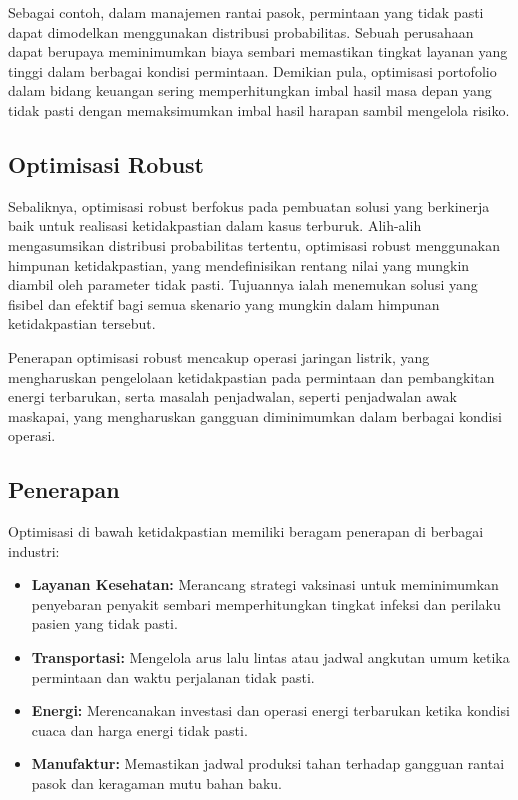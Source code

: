 Sebagai contoh, dalam manajemen rantai pasok, permintaan yang tidak pasti dapat dimodelkan menggunakan distribusi probabilitas. Sebuah perusahaan dapat berupaya meminimumkan biaya sembari memastikan tingkat layanan yang tinggi dalam berbagai kondisi permintaan. Demikian pula, optimisasi portofolio dalam bidang keuangan sering memperhitungkan imbal hasil masa depan yang tidak pasti dengan memaksimumkan imbal hasil harapan sambil mengelola risiko.

\subsection{Optimisasi Robust}

Sebaliknya, optimisasi robust berfokus pada pembuatan solusi yang berkinerja baik untuk realisasi ketidakpastian dalam kasus terburuk. Alih-alih mengasumsikan distribusi probabilitas tertentu, optimisasi robust menggunakan himpunan ketidakpastian, yang mendefinisikan rentang nilai yang mungkin diambil oleh parameter tidak pasti. Tujuannya ialah menemukan solusi yang fisibel dan efektif bagi semua skenario yang mungkin dalam himpunan ketidakpastian tersebut.

Penerapan optimisasi robust mencakup operasi jaringan listrik, yang mengharuskan pengelolaan ketidakpastian pada permintaan dan pembangkitan energi terbarukan, serta masalah penjadwalan, seperti penjadwalan awak maskapai, yang mengharuskan gangguan diminimumkan dalam berbagai kondisi operasi.

\subsection{Penerapan}

Optimisasi di bawah ketidakpastian memiliki beragam penerapan di berbagai industri:
\begin{itemize}
    \item \textbf{Layanan Kesehatan:} Merancang strategi vaksinasi untuk meminimumkan penyebaran penyakit sembari memperhitungkan tingkat infeksi dan perilaku pasien yang tidak pasti.
    \item \textbf{Transportasi:} Mengelola arus lalu lintas atau jadwal angkutan umum ketika permintaan dan waktu perjalanan tidak pasti.
    \item \textbf{Energi:} Merencanakan investasi dan operasi energi terbarukan ketika kondisi cuaca dan harga energi tidak pasti.
    \item \textbf{Manufaktur:} Memastikan jadwal produksi tahan terhadap gangguan rantai pasok dan keragaman mutu bahan baku.
\end{itemize}

